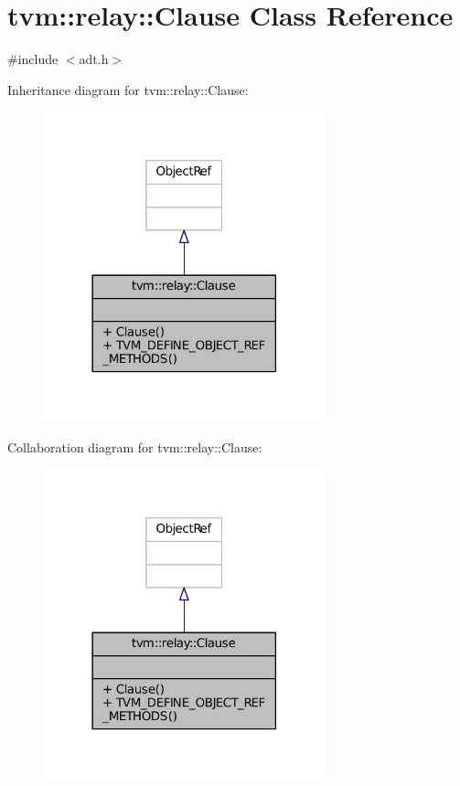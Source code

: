 \hypertarget{classtvm_1_1relay_1_1Clause}{}\section{tvm\+:\+:relay\+:\+:Clause Class Reference}
\label{classtvm_1_1relay_1_1Clause}


{\ttfamily \#include $<$adt.\+h$>$}



Inheritance diagram for tvm\+:\+:relay\+:\+:Clause\+:
\nopagebreak
\begin{figure}[H]
\begin{center}
\leavevmode
\includegraphics[width=230pt]{classtvm_1_1relay_1_1Clause__inherit__graph}
\end{center}
\end{figure}


Collaboration diagram for tvm\+:\+:relay\+:\+:Clause\+:
\nopagebreak
\begin{figure}[H]
\begin{center}
\leavevmode
\includegraphics[width=230pt]{classtvm_1_1relay_1_1Clause__coll__graph}
\end{center}
\end{figure}
